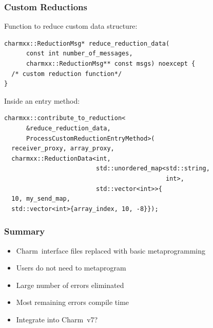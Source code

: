 \documentclass[svgnames,tikz,serif,ragged2e]{beamer}
\newcommand\Charm{Charm\nolinebreak[4]\hspace{-.05em}\raisebox{.4ex}{\relsize{-3}{\textbf{++}}}}
\begin{document}
\begin{frame}[fragile]
  \frametitle{Custom Reductions}
  Function to reduce custom data structure:
\begin{lstlisting}
charmxx::ReductionMsg* reduce_reduction_data(
      const int number_of_messages,
      charmxx::ReductionMsg** const msgs) noexcept {
  /* custom reduction function*/
}
\end{lstlisting}

  \pause
  Inside an entry method:
\begin{lstlisting}
charmxx::contribute_to_reduction<
      &reduce_reduction_data,
      ProcessCustomReductionEntryMethod>(
  receiver_proxy, array_proxy,
  charmxx::ReductionData<int,
                         std::unordered_map<std::string,
                                            int>,
                         std::vector<int>>{
  10, my_send_map,
  std::vector<int>{array_index, 10, -8}});
\end{lstlisting}
\end{frame}

\begin{frame}
  \frametitle{Summary}
  \begin{itemize}
  \item \Charm~interface files replaced with basic metaprogramming
  \item Users do not need to metaprogram
  \item Large number of errors eliminated
  \item Most remaining errors compile time
  \item Integrate into \Charm~v7?
  \end{itemize}
\end{frame}
\end{document}
